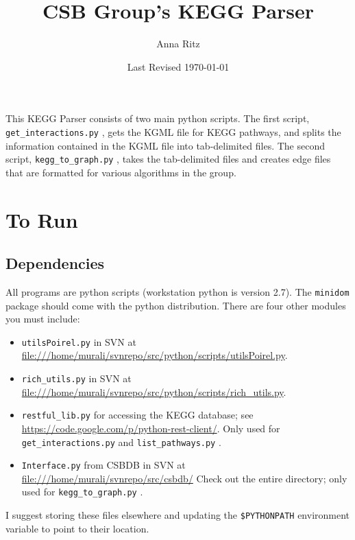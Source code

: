 \documentclass[10pt]{article}
\title{CSB Group's KEGG Parser}
\author{Anna Ritz}
\date{Last Revised \today}
\newcommand{\getinteractions}{\texttt{get\_interactions.py} }
\newcommand{\keggtograph}{\texttt{kegg\_to\_graph.py} }
\newcommand{\listpathways}{\texttt{list\_pathways.py} }
\begin{document}
\maketitle

This KEGG Parser consists of two main python scripts. The first script, \getinteractions, gets the KGML file for KEGG pathways, and splits the information contained in the KGML file into tab-delimited files.  The second script, \keggtograph, takes the tab-delimited files and creates edge files that are formatted for various algorithms in the group.

\tableofcontents 
\clearpage

\section{To Run}

\subsection{Dependencies}

All programs are python scripts (workstation python is version 2.7). The \texttt{minidom} package should come with the python distribution. There are four other modules you must include:
\begin{itemize}
\item \texttt{utilsPoirel.py} in SVN at \url{file:///home/murali/svnrepo/src/python/scripts/utilsPoirel.py}.
\item \texttt{rich\_utils.py} in SVN at \url{file:///home/murali/svnrepo/src/python/scripts/rich_utils.py}.
\item \texttt{restful\_lib.py} for accessing the KEGG database; see \url{https://code.google.com/p/python-rest-client/}.  Only used for \getinteractions and \listpathways.
\item \texttt{Interface.py} from CSBDB in SVN at \url{file:///home/murali/svnrepo/src/csbdb/} Check out the entire directory; only used for \keggtograph.
\end{itemize}
I suggest storing these files elsewhere and updating the \texttt{\$PYTHONPATH} environment variable to point to their location.
\end{document}
